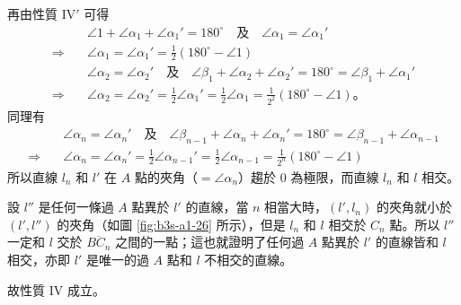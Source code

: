再由性質 $\mathrm{IV}'$ 可得
\begin{align*}
  &\angle 1 + \angle \alpha_1 + \angle \alpha_1' = 180^\circ \quad \text{及} \quad \angle \alpha_1 = \angle \alpha_1' \\
  \Longrightarrow\quad &\angle \alpha_1 = \angle \alpha_1' = \frac{1}{2}(180^\circ - \angle 1) \\[0.5em]
  &\angle \alpha_2 = \angle \alpha_2' \quad \text{及} \quad \angle \beta_1 + \angle \alpha_2 + \angle \alpha_2' = 180^\circ = \angle \beta_1 + \angle \alpha_1' \\
  \Longrightarrow\quad &\angle \alpha_2 = \angle \alpha_2' = \frac{1}{2}\angle \alpha_1' = \frac{1}{2}\angle \alpha_1 = \frac{1}{2^2}(180^\circ - \angle 1) \text{。}
\end{align*}
同理有
\begin{align*}
  &\angle \alpha_n = \angle \alpha_n' \quad \text{及} \quad \angle \beta_{n-1} + \angle \alpha_n + \angle \alpha_n' = 180^\circ = \angle \beta_{n-1} + \angle \alpha_{n-1} \\
  \Longrightarrow\quad &\angle \alpha_n = \angle \alpha_n' = \frac{1}{2}\angle \alpha_{n-1}' = \frac{1}{2}\angle \alpha_{n-1} = \frac{1}{2^n}(180^\circ - \angle 1)
\end{align*}
所以直線 $l_n$ 和 $l'$ 在 $A$ 點的夾角（$= \angle \alpha_n$）趨於 0 為極限，而直線 $l_n$ 和 $l$ 相交。

設 $l''$ 是任何一條過 $A$ 點異於 $l'$ 的直線，當 $n$ 相當大時，$(l', l_n)$ 的夾角就小於 $(l', l'')$ 的夾角（如圖 \ref{fig:b3s-a1-26} 所示），但是 $l_n$ 和 $l$ 相交於 $C_n$ 點。所以 $l''$ 一定和 $l$ 交於 $\overline{BC_n}$ 之間的一點；這也就證明了任何過 $A$ 點異於 $l'$ 的直線皆和 $l$ 相交，亦即 $l'$ 是唯一的過 $A$ 點和 $l$ 不相交的直線。

故性質 $\mathrm{IV}$ 成立。
